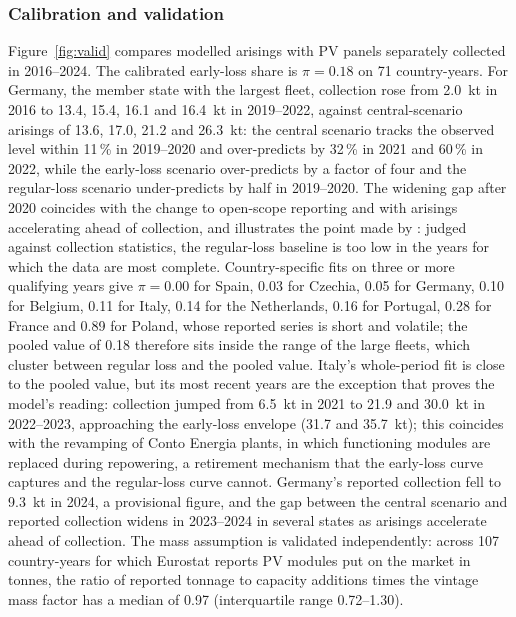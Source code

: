 \documentclass[a4paper,fleqn]{cas-sc}
\begin{document}
\subsubsection{Calibration and validation} Figure~\ref{fig:valid} compares modelled arisings with PV panels separately collected in 2016--2024. The calibrated early-loss share is $\pi=0.18$ on 71 country-years. For Germany, the member state with the largest fleet, collection rose from \SI{2.0}{kt} in 2016 to 13.4, 15.4, 16.1 and \SI{16.4}{kt} in 2019--2022, against central-scenario arisings of 13.6, 17.0, 21.2 and \SI{26.3}{kt}: the central scenario tracks the observed level within 11\,\% in 2019--2020 and over-predicts by 32\,\% in 2021 and 60\,\% in 2022, while the early-loss scenario over-predicts by a factor of four and the regular-loss scenario under-predicts by half in 2019--2020. The widening gap after 2020 coincides with the change to open-scope reporting and with arisings accelerating ahead of collection, and illustrates the point made by \citet{kastanaki2026}: judged against collection statistics, the regular-loss baseline is too low in the years for which the data are most complete. Country-specific fits on three or more qualifying years give $\pi=0.00$ for Spain, 0.03 for Czechia, 0.05 for Germany, 0.10 for Belgium, 0.11 for Italy, 0.14 for the Netherlands, 0.16 for Portugal, 0.28 for France and 0.89 for Poland, whose reported series is short and volatile; the pooled value of 0.18 therefore sits inside the range of the large fleets, which cluster between regular loss and the pooled value. Italy's whole-period fit is close to the pooled value, but its most recent years are the exception that proves the model's reading: collection jumped from \SI{6.5}{kt} in 2021 to 21.9 and \SI{30.0}{kt} in 2022--2023, approaching the early-loss envelope (31.7 and \SI{35.7}{kt}); this coincides with the revamping of Conto Energia plants, in which functioning modules are replaced during repowering, a retirement mechanism that the early-loss curve captures and the regular-loss curve cannot. Germany's reported collection fell to \SI{9.3}{kt} in 2024, a provisional figure, and the gap between the central scenario and reported collection widens in 2023--2024 in several states as arisings accelerate ahead of collection. The mass assumption is validated independently: across 107 country-years for which Eurostat reports PV modules put on the market in tonnes, the ratio of reported tonnage to capacity additions times the vintage mass factor has a median of 0.97 (interquartile range 0.72--1.30).
\end{document}
